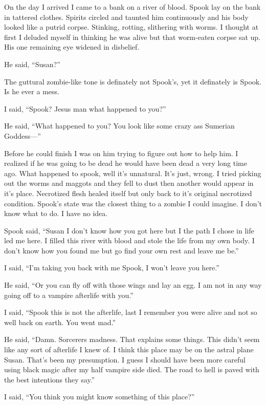  On the day I arrived I came to a bank on a river of blood. Spook lay on the bank in tattered clothes. Spirits circled and taunted him continuously and his body looked like a putrid corpse. Stinking, rotting, slithering with worms. I thought at first I deluded myself in thinking he was alive but that worm-eaten corpse sat up. His one remaining eye widened in disbelief.
 
 He said, ``Susan?''
 
 The guttural zombie-like tone is definately not Spook's, yet it definately is Spook. Is he ever a mess.
 
 I said, ``Spook? Jesus man what happened to you?''

He said, ``What happened to you? You look like some crazy ass Sumerian Goddess---''

Before he could finish I was on him trying to figure out how to help him. I realized if he was going to be dead he would have been dead a very long time ago. What happened to spook, well it's unnatural. It's just, wrong. I tried picking out the worms and maggots and they fell to dust then another would appear in it's place. Necrotized flesh healed itself but only back to it's original necrotized condition. Spook's state was the closest thing to a zombie I could imagine. I don't know what to do. I have no idea.

Spook said, ``Susan I don't know how you got here but I the path I chose in life led me here. I filled this river with blood and stole the life from my own body. I don't know how you found me but go find your own rest and leave me be.''

I said, ``I'm taking you back with me Spook, I won't leave you here.''

He said, ``Or you can fly off with those wings and lay an egg. I am not in any way going off to a vampire afterlife with you.''

I said, ``Spook this is not the afterlife, last I remember you were alive and not so well back on earth. You went mad.''

He said, ``Damn. Sorcerers madness. That explains some things. This didn't seem like any sort of afterlife I knew of. I think this place may be on the astral plane Susan. That's been my presumption. I guess I should have been more careful using black magic after my half vampire side died. The road to hell is paved with the best intentions they say.''

I said, ``You think you might know something of this place?''

